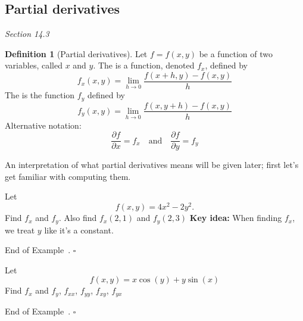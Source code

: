 \documentclass[10pt]{article}
\theoremstyle{definition}
\newtheorem{definition}[theorem]{Definition}
\newtheorem{example}[theorem]{Example}
\renewenvironment{example}
{\begin{oldexample}}
  {\par\smallskip\hfill   End of Example~\theexample. $\square$    \par\end{oldexample}}
\newcommand{\1}[1]{\textbf{1}_{\left[#1\right]}} %
\def\R{\mathbb{R}} %
\newcommand{\dempfcolor}[1]{{\color{RoyalBlue}#1}}
\newcommand{\demph}[1]{\dempfcolor{{\sl #1}}}
\begin{document}
\subsection{Partial derivatives}
\textit{Section 14.3}

\begin{definition}[Partial derivatives]
  Let $f=f(x,y)$ be a function of two variables, called $x$ and $y$.
  The \demph{partial derivative of $f$ with respect to the variable $x$} is a
  function, denoted $f_{x}$, defined by
  \begin{equation*}
    f_{x}(x,y) = \lim_{h \to 0} \frac{f(x+h,y)-f(x,y)}{h}
  \end{equation*}
  The \demph{partial derivative of $f$ with respect to $y$ } is the function
  $f_{y}$ defined by
  \begin{equation*}
    f_{y}(x,y)= \lim_{h \to 0} \frac{f(x,y+h)-f(x,y)}{h}
  \end{equation*}
  Alternative notation:
  \begin{equation*}
    \frac{\partial f}{\partial x} = f_{x}
    \quad \text{and} \quad
    \frac{\partial f}{\partial y} = f_{y}
  \end{equation*}
\end{definition}

An interpretation of what partial derivatives means will be given later; first
let's get familiar with computing them.

\begin{example}
  Let
  \begin{equation*}
    f(x,y) = 4x^{2}-2y^{2}.
  \end{equation*}
  Find $f_{x}$ and $f_{y}$. Also find $f_{x}(2,1)$ and $f_{y}(2,3)$
  \textbf{Key idea:} When finding $f_{x}$, we treat $y$ like it's a constant.
\end{example}


\begin{example}
  Let
  \begin{equation*}
    f(x,y) = x\cos(y)+y\sin(x)
  \end{equation*}
  Find $f_{x}$ and $f_{y}$, $f_{xx}$, $f_{yy}$, $f_{xy}$, $f_{yx}$
\end{example}
\end{document}
